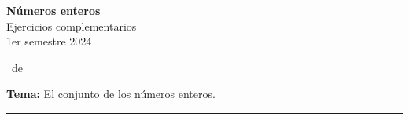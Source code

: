\documentclass[spanish,letterpaper, 11pt, addpoints, answers]{exam}
\begin{document}

\begin{center}
\textbf{Números enteros} \\
Ejercicios complementarios\\
1er semestre 2024
\end{center}
\extraheadheight{-0.5in}

\runningheadrule \extraheadheight{0.15in}

\vspace{0.15in}
\runningheadrule \extraheadheight{0.14in}

\runningfooter{}
              {\thepage\ de \numpages}
              {}
\vspace{0.05in}

\nopointsinmargin
\setlength\linefillthickness{0.1pt}
\setlength\answerlinelength{0.1in}
\vspace{0.1in}
\parbox{6in}{
\textbf{Tema:} El conjunto de los números enteros.}
\vspace{0.15in}
\hrule 
\end{document}
